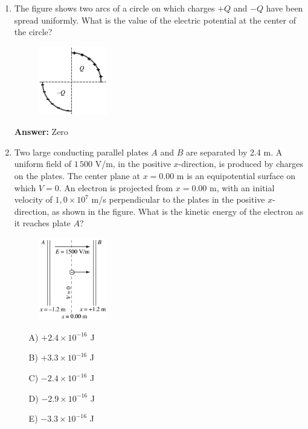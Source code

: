 \begin{enumerate}

\item The figure shows two arcs of a circle on which charges $+Q$ and $-Q$ have been spread uniformly. What is the value of the electric potential at the center of the circle?

\begin{figure}[H]
        \centering
        \includegraphics[width=0.28\textwidth]{figures-workshop01/problem-38.png}
    \end{figure}

\textbf{Answer:} Zero

\item Two large conducting parallel plates $A$ and $B$ are separated by 2.4 m. A uniform field of $1\,500$ V/m, in the positive $x$-direction, is produced by charges on the plates. The center plane at $x=0.00$ m is an equipotential surface on which $V=0$. An electron is projected from $x=0.00$ m, with an initial velocity of $1,0\times10^7$ m/s perpendicular to the plates in the positive $x$-direction, as shown in the figure. What is the kinetic energy of the electron as it reaches plate $A$?

\begin{figure}[H]
        \centering
        \includegraphics[width=0.28\textwidth]{figures-workshop01/problem-39.png}
    \end{figure}

\begin{multicols}{5}
    \begin{itemize}
        \item[A)] $+2.4\times10^{-16}$ J
        \item[B)] $+3.3\times10^{-16}$ J
        \item[C)] $-2.4\times10^{-16}$ J
        \item[D)] $-2.9\times10^{-16}$ J
        \item[E)] $-3.3\times10^{-16}$ J
    \end{itemize}
\end{multicols}


\end{enumerate}

